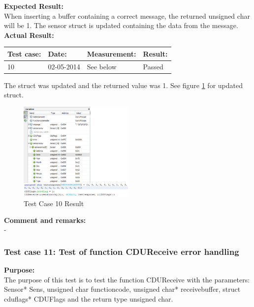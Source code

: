 \textbf{Expected Result:}\\
When inserting a buffer containing a correct message, the returned unsigned char will be 1. The sensor struct is updated containing the data from the message.\\

\textbf{Actual Result:}\\
\begin{table}[H]
\centering
\begin{tabular}{|p{2cm}|p{2cm}|p{3cm}|p{2cm}|}\hline
\textbf{Test case:} & \textbf{Date:} & \textbf{Measurement:} & \textbf{Result:} \\ \hline
10 & 02-05-2014 & See below & Passed \\ \hline
\end{tabular}
\end{table}
The struct was updated and the returned value was 1. See figure \ref{fig:cdutestcase10} for updated struct.\\
\begin{figure}[H]
\centering
\includegraphics[width=0.5\textwidth]{billeder/CDUtestcase10}
\caption{Test Case 10 Result}
\label{fig:cdutestcase10}
\end{figure}

\textbf{Comment and remarks:}\\
-\\

\subsubsection{Test case 11: Test of function CDUReceive error handling }
\textbf{Purpose:}\\
The purpose of this test is to test the function CDUReceive with the parameters: Sensor* Sens, unsigned char functioncode, unsigned char* receivebuffer, struct cduflags* CDUFlags and the return type unsigned char.\\

